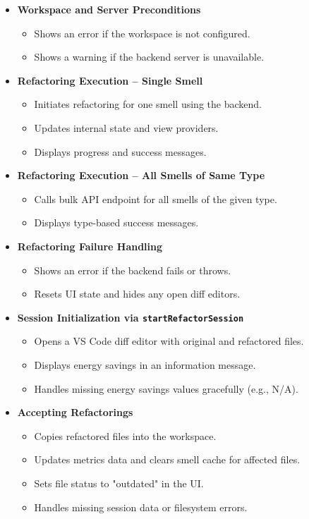 \documentclass[12pt, titlepage]{article}
\begin{document}
\begin{itemize}
  \item \textbf{Workspace and Server Preconditions}
    \begin{itemize}
      \item Shows an error if the workspace is not configured.
      \item Shows a warning if the backend server is unavailable.
    \end{itemize}

  \item \textbf{Refactoring Execution – Single Smell}
    \begin{itemize}
      \item Initiates refactoring for one smell using the backend.
      \item Updates internal state and view providers.
      \item Displays progress and success messages.
    \end{itemize}

  \item \textbf{Refactoring Execution – All Smells of Same Type}
    \begin{itemize}
      \item Calls bulk API endpoint for all smells of the given type.
      \item Displays type-based success messages.
    \end{itemize}

  \item \textbf{Refactoring Failure Handling}
    \begin{itemize}
      \item Shows an error if the backend fails or throws.
      \item Resets UI state and hides any open diff editors.
    \end{itemize}

  \item \textbf{Session Initialization via \texttt{startRefactorSession}}
    \begin{itemize}
      \item Opens a VS Code diff editor with original and refactored files.
      \item Displays energy savings in an information message.
      \item Handles missing energy savings values gracefully (e.g., N/A).
    \end{itemize}

  \item \textbf{Accepting Refactorings}
    \begin{itemize}
      \item Copies refactored files into the workspace.
      \item Updates metrics data and clears smell cache for affected files.
      \item Sets file status to "outdated" in the UI.
      \item Handles missing session data or filesystem errors.
    \end{itemize}


\end{itemize}
\end{document}
